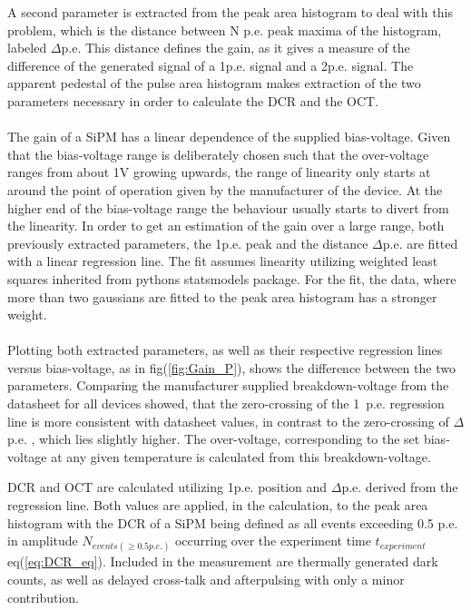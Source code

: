 \documentclass[12pt,article,type=msc,colorback,accentcolor=tud9c]{tudthesis}
\begin{document}
A second parameter is extracted from the peak area histogram to deal with this problem, which is the distance between N p.e. peak maxima of the histogram, labeled $\Delta$p.e. This distance defines the gain, as it gives a measure of the difference of the generated signal of a 1p.e. signal and a 2p.e. signal. The apparent pedestal of the pulse area histogram makes extraction of the two parameters necessary in order to calculate the DCR and the OCT.\\\\ The gain of a SiPM has a linear dependence of the supplied bias-voltage. Given that the bias-voltage range is deliberately chosen such that the over-voltage ranges from about 1V growing upwards, the range of linearity only starts at around the point of operation given by the manufacturer of the device. At the higher end of the bias-voltage range the behaviour usually starts to divert from the linearity. In order to get an estimation of the gain over a large range, both previously extracted parameters, the 1p.e. peak and the distance $\Delta$p.e. are fitted with a linear regression line. The fit assumes linearity utilizing weighted least squares inherited from pythons statsmodels package. For the fit, the data, where more than two gaussians are fitted to the peak area histogram has a stronger weight.\\\\ Plotting both extracted parameters, as well as their respective regression lines versus bias-voltage, as in fig(\ref{fig:Gain_P}), shows the difference between the two parameters. Comparing the manufacturer supplied breakdown-voltage from the datasheet for all devices showed, that the zero-crossing of the 1~p.e. regression line is more consistent with datasheet values, in contrast to the zero-crossing of $\Delta$p.e. , which lies slightly higher. The over-voltage, corresponding to the set bias-voltage at any given temperature is calculated from this breakdown-voltage. 


DCR and OCT are calculated utilizing 1p.e. position and $\Delta$p.e. derived from the regression line. Both values are applied, in the calculation, to the peak area histogram with the DCR of a SiPM being defined as all events exceeding 0.5 p.e. in amplitude $N_{events(\geq 0.5p.e.)}$ occurring over the experiment time $t_{experiment}$ eq(\ref{eq:DCR_eq}). Included in the measurement are thermally generated dark counts, as well as delayed cross-talk and afterpulsing with only a minor contribution.
\end{document}
